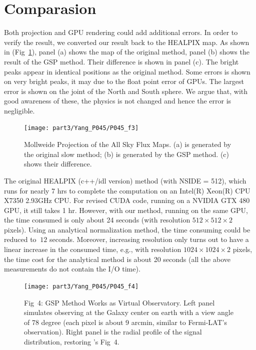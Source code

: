 \section{Comparasion}
Both projection and GPU rendering could add additional errors. In order to verify the result, we converted our result back to the HEALPIX map. As shown in (Fig~\ref{figcmp}), panel (a) shows the map of the original method, panel (b) shows the result of the GSP method. Their difference is shown in panel (c). The bright peaks appear in identical positions as the original method. Some errors is shown on very bright peaks, it may due to the float point error of GPUs. The largest error is shown on the joint of the North and South sphere. We argue that, with good awareness of these, the physics is not changed and hence the error is negligible. 

\begin{figure}[htb]
\begin{center}
 \texttt{[image: part3/Yang\_P045/P045\_f3]}
\caption{Mollweide Projection of the All Sky Flux Maps. (a) is generated by the original slow method; (b) is generated by the GSP method. (c) shows their difference. \label{figcmp}}
\end{center}
\end{figure}

The original HEALPIX (c++/idl version) method (with NSIDE = 512), which runs for nearly 7 hrs to complete the computation on an Intel(R) Xeon(R) CPU X7350 2.93GHz CPU. For revised CUDA code, running on a NVIDIA GTX 480 GPU, it still takes 1 hr. However, with our method, running on the same GPU, the time consumed is only about 24 seconds (with resolution $512\times512\times2$ pixels). Using an analytical normalization method, the time consuming could be reduced to $~12$ seconds. Moreover, increasing resolution only turns out to have a linear increase in the consumed time, e.g., with resolution $1024\times1024\times2$ pixels, the time cost for the analytical method is about 20 seconds (all the above measurements do not contain the I/O time). 

\begin{figure}[htb]
\begin{center}
 \texttt{[image: part3/Yang\_P045/P045\_f4]}
\caption{Fig~4: GSP Method Works as Virtual Observatory. Left panel simulates observing at the Galaxy center on earth with a view angle of 78 degree (each pixel is about 9 arcmin, similar to Fermi-LAT’s observation). Right panel is the radial profile of the signal distribution, restoring \citet{Kuhlen:2008kr}'s Fig~4.  \label{figapp}}
\end{center}
\end{figure}

